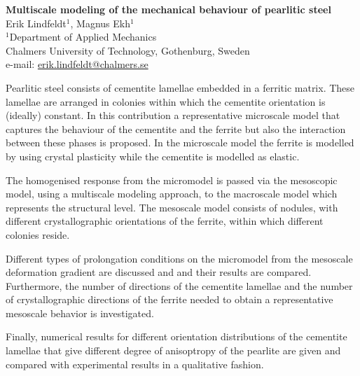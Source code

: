 \documentclass[11pt,a4paper]{article}
\begin{document}
\begin{center}

\textbf{\Large Multiscale modeling of the mechanical behaviour of pearlitic steel}
\\[5mm]

\textrm{\large Erik Lindfeldt${}_{}^{1}$, Magnus Ekh${}_{}^{1}$}
\\[5mm]

\textrm{${}_{}^{1}$Department of Applied Mechanics\\
Chalmers University of Technology, Gothenburg, Sweden\\
e-mail: \url{erik.lindfeldt@chalmers.se}}
\\[5mm]
\end{center}


Pearlitic steel consists of cementite lamellae embedded in a ferritic matrix. These lamellae are
arranged in colonies within which the cementite orientation is (ideally) constant. In this
contribution a representative microscale model that captures the behaviour of the cementite and the
ferrite but also the interaction between these phases is proposed. In the microscale model the
ferrite is modelled by using crystal plasticity \cite{Ekh} while the cementite is modelled as
elastic.

The homogenised response from the micromodel is passed via the mesoscopic model, using a multiscale
modeling approach, to the macroscale model which represents the structural level. The mesoscale
model consists of nodules, with different crystallographic orientations of the ferrite, within which
different colonies reside.

Different types of prolongation conditions on the micromodel from the mesoscale deformation gradient
are discussed and and their results are compared. Furthermore, the number of directions of the
cementite lamellae and the number of crystallographic directions of the ferrite needed to obtain a
representative mesoscale behavior is investigated. 

Finally, numerical results for different orientation distributions of the
cementite lamellae that give different degree of anisoptropy of the pearlite are given and compared
with experimental results in a qualitative fashion. 

\end{document}
